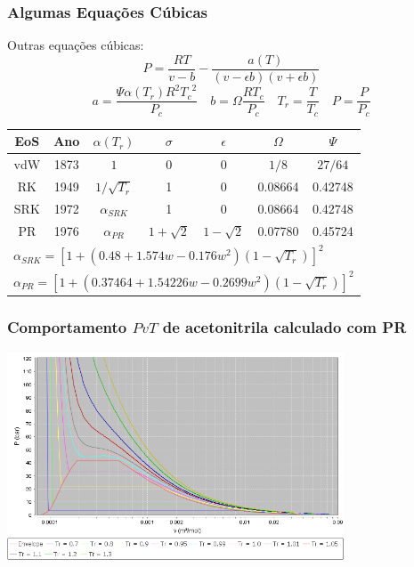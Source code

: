 \documentclass[aspectratio=169]{beamer}
\begin{document}
\begin{frame}
	\frametitle{Algumas Equações Cúbicas}
	Outras equações cúbicas:
	\begin{equation*}
		P= \frac{RT}{v-b}-\frac{a(T)}{(v-\epsilon b)(v+\epsilon b)}
	\end{equation*}
	\begin{equation*}
		a= \frac{\Psi \alpha(T_r) R^2 {T_c}^2}{P_c} \quad b= \Omega \frac{RT_c}{P_c}
		\quad T_r = \frac{T}{T_c} \quad P= \frac{P}{P_c}
	\end{equation*}
	\begin{table}
		\begin{tabular}{cc|ccccc}
		\hline
		{EoS} & Ano & {$\alpha(T_r)$} & {$\sigma$}& {$\epsilon$}&
		{$\Omega$}& {$\Psi$} \\
		\hline
		vdW  & 1873& $1$ & 0 & 0 & $1/8$ & $27/64$\\
		RK & 1949 & $1/\sqrt{T_r}$ & 1 & 0 & 0.08664& 0.42748\\
		SRK & 1972 & $\alpha_{SRK}$ & 1 & 0 & 0.08664& 0.42748\\
		PR & 1976 & $\alpha_{PR}$ & $1+\sqrt{2}$ & $1-\sqrt{2}$ & 0.07780 & 0.45724\\
		\hline
		\multicolumn{7}{l}{$\alpha_{SRK}=\left[1+\left(0.48+1.574w-0.176w^2\right)
		\left(1-\sqrt{T_r}\right) \right]^2$}\\
		\multicolumn{7}{l}{$\alpha_{PR}=\left[1+\left(0.37464+1.54226w-0.2699w^2\right)
		\left(1-\sqrt{T_r}\right) \right]^2$}\\
		\hline
		\end{tabular}
	\end{table}
\end{frame}

\begin{frame}
	\frametitle{Comportamento $PvT$ de acetonitrila calculado com PR}
	\begin{center}
		\includegraphics[width=0.75\textwidth]{img/Acetonitrila.png} 
	\end{center}
\end{frame}
\end{document}
